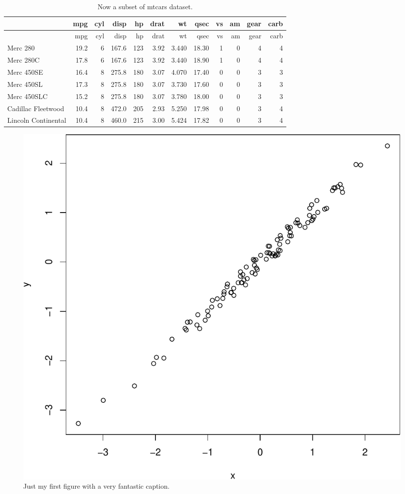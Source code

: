 \documentclass[11pt,a4paper]{article}
\begin{document}
\begin{longtable}[]{@{}lrrrrrrrrrrr@{}}
\caption{Now a subset of mtcars dataset.}\tabularnewline
\toprule
& mpg & cyl & disp & hp & drat & wt & qsec & vs & am & gear &
carb\tabularnewline
\midrule
\endfirsthead
\toprule
& mpg & cyl & disp & hp & drat & wt & qsec & vs & am & gear &
carb\tabularnewline
\midrule
\endhead
Merc 280 & 19.2 & 6 & 167.6 & 123 & 3.92 & 3.440 & 18.30 & 1 & 0 & 4 &
4\tabularnewline
Merc 280C & 17.8 & 6 & 167.6 & 123 & 3.92 & 3.440 & 18.90 & 1 & 0 & 4 &
4\tabularnewline
Merc 450SE & 16.4 & 8 & 275.8 & 180 & 3.07 & 4.070 & 17.40 & 0 & 0 & 3 &
3\tabularnewline
Merc 450SL & 17.3 & 8 & 275.8 & 180 & 3.07 & 3.730 & 17.60 & 0 & 0 & 3 &
3\tabularnewline
Merc 450SLC & 15.2 & 8 & 275.8 & 180 & 3.07 & 3.780 & 18.00 & 0 & 0 & 3
& 3\tabularnewline
Cadillac Fleetwood & 10.4 & 8 & 472.0 & 205 & 2.93 & 5.250 & 17.98 & 0 &
0 & 3 & 4\tabularnewline
Lincoln Continental & 10.4 & 8 & 460.0 & 215 & 3.00 & 5.424 & 17.82 & 0
& 0 & 3 & 4\tabularnewline
\bottomrule
\end{longtable}

\clearpage

\listoffigures

\newpage

\begin{figure}
\centering
\includegraphics{output/figures/Fig1-1.pdf}
\caption{Just my first figure with a very fantastic caption.}
\end{figure}
\end{document}
